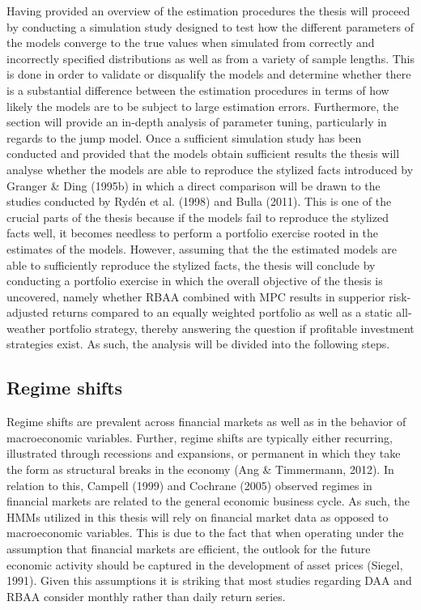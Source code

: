 Having provided an overview of the estimation procedures the thesis will proceed by conducting a simulation study designed to test how the different parameters of the models converge to the true values when simulated from correctly and incorrectly specified distributions as well as from a variety of sample lengths. This is done in order to validate or disqualify the models and determine whether there is a substantial difference between the estimation procedures in terms of how likely the models are to be subject to large estimation errors. Furthermore, the section will provide an in-depth analysis of parameter tuning, particularly in regards to the jump model. Once a sufficient simulation study has been conducted and provided that the models obtain sufficient results the thesis will analyse whether the models are able to reproduce the stylized facts introduced by Granger \& Ding (1995b) in which a direct comparison will be drawn to the studies conducted by Rydén et al. (1998) and Bulla (2011). This is one of the crucial parts of the thesis because if the models fail to reproduce the stylized facts well, it becomes needless to perform a portfolio exercise rooted in the estimates of the models. However, assuming that the the estimated models are able to sufficiently reproduce the stylized facts, the thesis will conclude by conducting a portfolio exercise in which the overall objective of the thesis is uncovered, namely whether RBAA combined with MPC results in supperior risk-adjusted returns compared to an equally weighted portfolio as well as a static all-weather portfolio strategy, thereby answering the question if profitable investment strategies exist. As such, the analysis will be divided into the following steps.



\subsection{Regime shifts}
Regime shifts are prevalent across financial markets as well as in the behavior of macroeconomic variables. Further, regime shifts are typically either recurring, illustrated through recessions and expansions, or permanent in which they take the form as structural breaks in the economy (Ang \& Timmermann, 2012). In relation to this, Campell (1999) and Cochrane (2005) observed regimes in financial markets are related to the general economic business cycle. As such, the HMMs utilized in this thesis will rely on financial market data as opposed to macroeconomic variables. This is due to the fact that when operating under the assumption that financial markets are efficient, the outlook for the future economic activity should be captured in the development of asset prices (Siegel, 1991). Given this assumptions it is striking that most studies regarding DAA and RBAA consider monthly rather than daily return series. 

